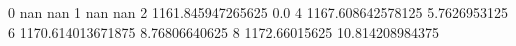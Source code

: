 0 nan nan
1 nan nan
2 1161.845947265625 0.0
4 1167.608642578125 5.7626953125
6 1170.614013671875 8.76806640625
8 1172.66015625 10.814208984375

